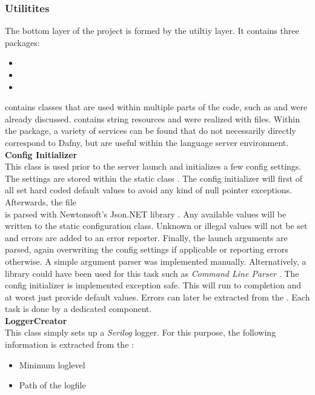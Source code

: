 \subsubsection{Utilitites}
The bottom layer of the project is formed by the utiltiy layer.
It contains three packages:
\begin{itemize}
    \item {}
    \item {}
    \item {}
\end{itemize}
 contains classes that are used within multiple parts of the code, such as  and were already discussed.
 contains string resources and were realized with  files.
Within the  package,
a variety of services can be found that do not necessarily directly correspond to Dafny,
but are useful within the language server environment.\\

\textbf{Config Initializer}\\
This class is used prior to the server launch and initializes a few config settings.
The settings are stored within the static class .
The config initializer will first of all set hard coded default values to avoid any kind of null pointer exceptions.
Afterwards, the file \\
 is parsed with Newtonsoft's Json.NET library \cite{jsondotnet}.
Any available values will be written to the static configuration class.
Unknown or illegal values will not be set and errors are added to an error reporter.
Finally, the launch arguments are parsed, again overwriting the config settings if applicable or reporting errors otherwise.
A simple argument parser was implemented manually.
Alternatively, a library could have been used for this task such as \textit{Command Line Parser} \cite{clparser}.
The config initializer is implemented exception safe.
This will run to completion and at worst just provide default values.
Errors can later be extracted from the .
Each task is done by a dedicated component.\\

\textbf{LoggerCreator}\\
This class simply sets up a \textit{Serilog} \cite{serilog} logger.
For this purpose, the following information is extracted from the :
\begin{itemize}
    \item Minimum loglevel
    \item Path of the logfile
\end{itemize}

